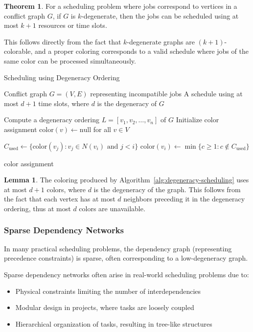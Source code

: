 \documentclass{article}
\theoremstyle{definition}
\newtheorem{theorem}{Theorem}
\newtheorem{lemma}{Lemma}
\begin{document}
\begin{theorem}
For a scheduling problem where jobs correspond to vertices in a conflict graph $G$, if $G$ is $k$-degenerate, then the jobs can be scheduled using at most $k+1$ resources or time slots.
\end{theorem}
This follows directly from the fact that $k$-degenerate graphs are $(k+1)$-colorable, and a proper coloring corresponds to a valid schedule where jobs of the same color can be processed simultaneously.

\begin{algorithm}
\caption{Scheduling using Degeneracy Ordering}
\label{alg:degeneracy-scheduling}
\begin{algorithmic}[1]
    \Require Conflict graph $G = (V, E)$ representing incompatible jobs
    \Ensure A schedule using at most $d+1$ time slots, where $d$ is the degeneracy of $G$
    
    \State Compute a degeneracy ordering $L = [v_1, v_2, \ldots, v_n]$ of $G$
    \State Initialize color assignment $\text{color}(v) \gets \text{null}$ for all $v \in V$
    
        \State $C_{\text{used}} \gets \{\text{color}(v_j) : v_j \in N(v_i) \text{ and } j < i\}$ 
        \State $\text{color}(v_i) \gets \min\{c \geq 1 : c \notin C_{\text{used}}\}$ 
    \EndFor
    
    \State \Return $\text{color}$ assignment
\end{algorithmic}
\end{algorithm}

\begin{lemma}
The coloring produced by Algorithm~\ref{alg:degeneracy-scheduling} uses at most $d+1$ colors, where $d$ is the degeneracy of the graph. This follows from the fact that each vertex has at most $d$ neighbors preceding it in the degeneracy ordering, thus at most $d$ colors are unavailable.
\end{lemma}

\subsubsection*{Sparse Dependency Networks}

In many practical scheduling problems, the dependency graph (representing precedence constraints) is sparse, often corresponding to a low-degeneracy graph.

Sparse dependency networks often arise in real-world scheduling problems due to:
\begin{itemize}
    \item Physical constraints limiting the number of interdependencies
    \item Modular design in projects, where tasks are loosely coupled
    \item Hierarchical organization of tasks, resulting in tree-like structures
\end{itemize}
\end{document}
